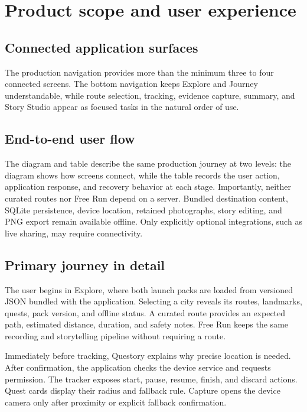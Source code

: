 \section{Product scope and user experience}

\subsection{Connected application surfaces}


The production navigation provides more than the minimum three to four connected
screens. The bottom navigation keeps Explore and Journey understandable, while
route selection, tracking, evidence capture, summary, and Story Studio appear as
focused tasks in the natural order of use.



\subsection{End-to-end user flow}


The diagram and table describe the same production journey at two levels: the
diagram shows how screens connect, while the table records the user action,
application response, and recovery behavior at each stage. Importantly, neither
curated routes nor Free Run depend on a server. Bundled destination content,
SQLite persistence, device location, retained photographs, story editing, and
PNG export remain available offline. Only explicitly optional integrations,
such as live sharing, may require connectivity.

\subsection{Primary journey in detail}
The user begins in Explore, where both launch packs are loaded from versioned
JSON bundled with the application. Selecting a city reveals its routes,
landmarks, quests, pack version, and offline status. A curated route provides an
expected path, estimated distance, duration, and safety notes. Free Run keeps the
same recording and storytelling pipeline without requiring a route.

Immediately before tracking, Questory explains why precise location is needed.
After confirmation, the application checks the device service and requests
permission. The tracker exposes start, pause, resume, finish, and discard actions.
Quest cards display their radius and fallback rule. Capture opens the device
camera only after proximity or explicit fallback confirmation.


